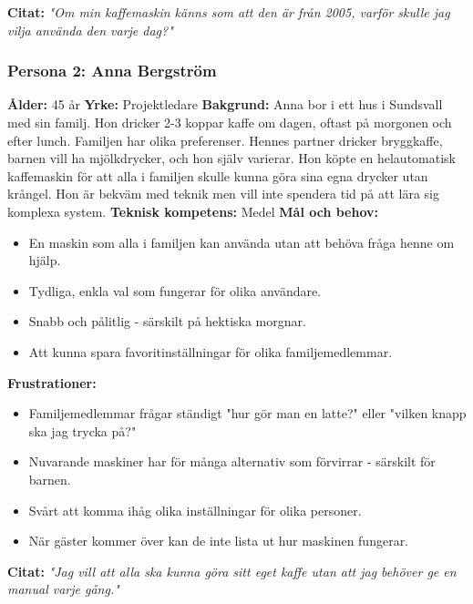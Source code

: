 \textbf{Citat:} \textit{"Om min kaffemaskin känns som att den är från 2005, varför skulle jag vilja använda den varje dag?"}


\subsubsection{Persona 2: Anna Bergström}
\textbf{Ålder:} 45 år
\textbf{Yrke:} Projektledare
\textbf{Bakgrund:} Anna bor i ett hus i Sundsvall med sin familj. Hon dricker 2-3 koppar kaffe om dagen, oftast på morgonen och efter lunch. Familjen har olika preferenser. Hennes partner dricker bryggkaffe, barnen vill ha mjölkdrycker, och hon själv varierar. Hon köpte en helautomatisk kaffemaskin för att alla i familjen skulle kunna göra sina egna drycker utan krångel. Hon är bekväm med teknik men vill inte spendera tid på att lära sig komplexa system.
\textbf{Teknisk kompetens:} Medel
\textbf{Mål och behov:}
\begin{itemize}
\item En maskin som alla i familjen kan använda utan att behöva fråga henne om hjälp.
\item Tydliga, enkla val som fungerar för olika användare.
\item Snabb och pålitlig - särskilt på hektiska morgnar.
\item Att kunna spara favoritinställningar för olika familjemedlemmar.
\end{itemize}
\textbf{Frustrationer:}
\begin{itemize}
\item Familjemedlemmar frågar ständigt "hur gör man en latte?" eller "vilken knapp ska jag trycka på?"
\item Nuvarande maskiner har för många alternativ som förvirrar - särskilt för barnen.
\item Svårt att komma ihåg olika inställningar för olika personer.
\item När gäster kommer över kan de inte lista ut hur maskinen fungerar.
\end{itemize}
\textbf{Citat:} \textit{"Jag vill att alla ska kunna göra sitt eget kaffe utan att jag behöver ge en manual varje gång."}

